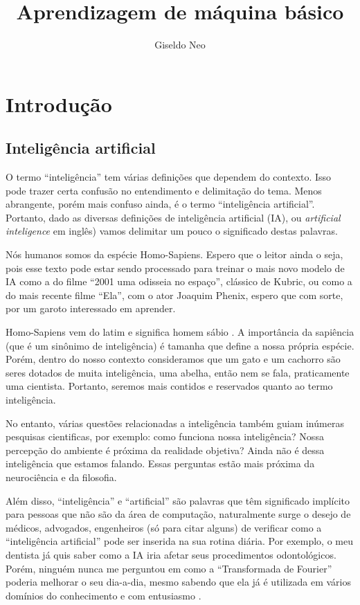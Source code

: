 \documentclass[a4paper,12pt]{book}
\author{Giseldo Neo}
\title{Aprendizagem de máquina básico}
\begin{document}
\maketitle
\tableofcontents

\chapter{Introdução}

	\section{Inteligência artificial}
		
	O termo ``inteligência'' tem várias definições que dependem do contexto. Isso pode trazer certa confusão no entendimento e delimitação do tema. Menos abrangente, porém mais confuso ainda, é o termo ``inteligência artificial''. Portanto, dado as diversas definições de inteligência artificial (IA), ou \textit{artificial inteligence} em inglês) vamos delimitar um pouco o significado destas palavras.
	
	Nós humanos somos da espécie Homo-Sapiens. Espero que o leitor ainda o seja, pois esse texto pode estar sendo processado para treinar o mais novo modelo de IA como a do filme ``2001 uma odisseia no espaço'', clássico de Kubric, ou como a do mais recente filme ``Ela'', com o ator Joaquim Phenix, espero que com sorte, por um garoto interessado em aprender. 
	
	Homo-Sapiens vem do latim e significa homem sábio \cite{wikipediahumano}. A importância da sapiência (que é um sinônimo de inteligência) é tamanha que define a nossa própria espécie. Porém, dentro do nosso contexto consideramos que um gato e um cachorro são seres dotados de muita inteligência, uma abelha, então nem se fala, praticamente uma cientista. Portanto, seremos mais contidos e reservados quanto ao termo inteligência.
	
	No entanto, várias questões relacionadas a inteligência também guiam inúmeras pesquisas cientificas, por exemplo: como funciona nossa inteligência? Nossa percepção do ambiente é próxima da realidade objetiva? Ainda não é dessa inteligência que estamos falando. Essas perguntas estão mais próxima da neurociência e da filosofia.
	
	Além disso, ``inteligência'' e ``artificial'' são palavras que têm significado implícito para pessoas que não são da área de computação, naturalmente surge o desejo de médicos, advogados, engenheiros (só para citar alguns) de verificar como a “inteligência artificial” pode ser inserida na sua rotina diária. Por exemplo, o meu dentista já quis saber como a IA iria afetar seus procedimentos odontológicos. Porém, ninguém nunca me perguntou em como a ``Transformada de Fourier'' poderia melhorar o seu dia-a-dia, mesmo sabendo que ela já é utilizada em vários domínios do conhecimento e com entusiasmo \cite{wikipediafourier}.
	
\end{document}
